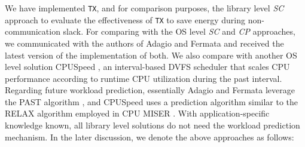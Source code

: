 \documentclass[12pt]{elsarticle}
\begin{document}
\begin{comment}
We have implemented all three approaches for energy efficient distributed Cholesky factorization to evaluate the advantages of the \emph{TDS} approach over the na\"{\i}ve approach and the \emph{CP} approach. Our implementation was accomplished by rewriting the \textsf{pdpotrf()} routine provided by ScaLAPACK \cite{scalapack} and DPLASMA \cite{dplasma}, two widely employed high performance and scalable numerical linear algebra libraries for distributed-memory multicore architectures. For achieving optimal performance of computation, we employ the \textsf{dsyrk()}, \textsf{dpotrf()}, and \textsf{dtrsm()} routines provided by LAPACK \cite{lapack}, the core linear algebra library called by ScaLAPACK under the hood. We improve communication performance by leveraging high performance pipeline broadcast with tuned chunk size \cite{ccgrid14}. The rewritten \textsf{pdpotrf()} has the same interface and is able to produce the same results as the original \textsf{pdpotrf()} of ScaLAPACK and DPLASMA, with total normalized differences between the range of $10^{-30}$ and $10^{-23}$ in our experiments.

Our goal of the evaluation is to experimentally observe that compared to the two classic approaches, the optimal energy efficiency can be achieved using our \emph{TDS} approach for task-parallel algorithms and applications running on distributed-memory clusters such as distributed Cholesky factorization. Meanwhile, the two classic approaches are widely used due to the advantage of minor performance loss to the original application. We evaluate our \emph{TDS} approach that it also incurs negligible performance loss. Moreover, we also evaluate energy efficiency of our implementation of \textsf{pdpotrf()} against ScaLAPACK and DPLASMA \textsf{pdpotrf()} routines with similar performance.
\end{comment}

We have implemented \texttt{TX}, and for comparison purposes, the library level \emph{SC} approach to evaluate the effectiveness of \texttt{TX} to save energy during non-communication slack. For comparing with the OS level \emph{SC} and \emph{CP} approaches, we communicated with the authors of Adagio \cite{ics09} and Fermata \cite{sc07} and received the latest version of the implementation of both. We also compare with another OS level solution CPUSpeed \cite{cpuspeed}, an interval-based DVFS scheduler that scales CPU performance according to runtime CPU utilization during the past interval. Regarding future workload prediction, essentially Adagio and Fermata leverage the PAST algorithm \cite{osdi94}, and CPUSpeed uses a prediction algorithm similar to the RELAX algorithm employed in CPU MISER \cite{icpp07}. With application-specific knowledge known, all library level solutions do not need the workload prediction mechanism. In the later discussion, we denote the above approaches as follows:
\end{document}
